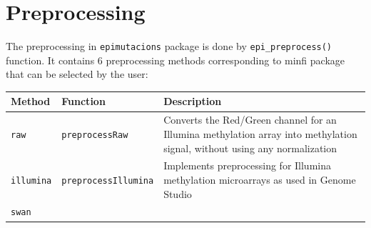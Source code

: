\documentclass[
]{article}
\begin{document}
\hypertarget{preprocessing}{%
\section{Preprocessing}\label{preprocessing}}

The preprocessing in \texttt{epimutacions} package is done by
\texttt{epi\_preprocess()} function. It contains 6 preprocessing methods
corresponding to minfi package that can be selected by the user:

\begin{longtable}[]{@{}lll@{}}
\toprule
\begin{minipage}[b]{0.12\columnwidth}\raggedright
Method\strut
\end{minipage} & \begin{minipage}[b]{0.23\columnwidth}\raggedright
Function\strut
\end{minipage} & \begin{minipage}[b]{0.55\columnwidth}\raggedright
Description\strut
\end{minipage}\tabularnewline
\midrule
\endhead
\begin{minipage}[t]{0.12\columnwidth}\raggedright
\texttt{raw}\strut
\end{minipage} & \begin{minipage}[t]{0.23\columnwidth}\raggedright
\texttt{preprocessRaw}\strut
\end{minipage} & \begin{minipage}[t]{0.55\columnwidth}\raggedright
Converts the Red/Green channel for an Illumina methylation array into
methylation signal, without using any normalization\strut
\end{minipage}\tabularnewline
\begin{minipage}[t]{0.12\columnwidth}\raggedright
\texttt{illumina}\strut
\end{minipage} & \begin{minipage}[t]{0.23\columnwidth}\raggedright
\texttt{preprocessIllumina}\strut
\end{minipage} & \begin{minipage}[t]{0.55\columnwidth}\raggedright
Implements preprocessing for Illumina methylation microarrays as used in
Genome Studio\strut
\end{minipage}\tabularnewline
\begin{minipage}[t]{0.12\columnwidth}\raggedright
\texttt{swan}\strut
\end{minipage} & \begin{minipage}[t]{0.23\columnwidth}\raggedright

\end{minipage}
\end{longtable}
\end{document}
